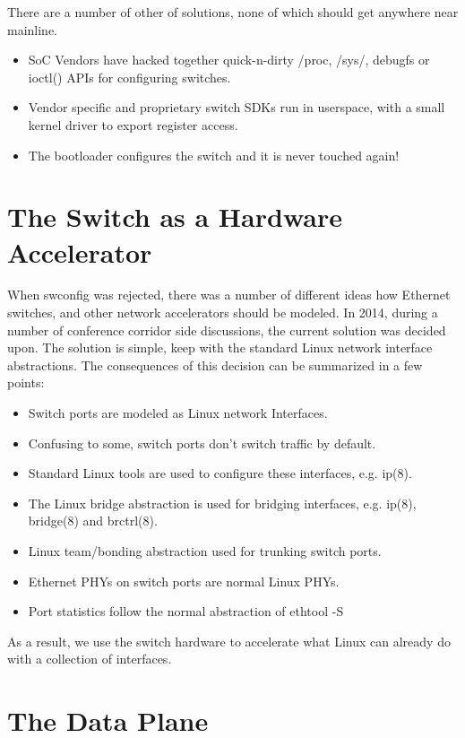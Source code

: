 \documentclass[letterpaper]{article}
\begin{document}
There are a number of other of solutions, none of which should get
anywhere near mainline.

\begin{itemize}
\item SoC Vendors have hacked together quick-n-dirty /proc, /sys/,
  debugfs or ioctl() APIs for configuring switches.
\item Vendor specific and proprietary switch SDKs run in userspace,
  with a small kernel driver to export register access.
\item The bootloader configures the switch and it is never touched again!
\end{itemize}

\section{The Switch as a Hardware Accelerator}

When swconfig was rejected, there was a number of different ideas how
Ethernet switches, and other network accelerators should be
modeled. In 2014, during a number of conference corridor side
discussions, the current solution was decided upon. The solution is
simple, keep with the standard Linux network interface
abstractions. The consequences of this decision can be summarized in a
few points:

\begin{itemize}
\item Switch ports are modeled as Linux network Interfaces.
\item Confusing to some, switch ports don't switch traffic by default.
\item Standard Linux tools are used to configure these interfaces, e.g. ip(8).
\item The Linux bridge abstraction is used for bridging interfaces, e.g. ip(8), bridge(8) and brctrl(8).
\item Linux team/bonding abstraction used for trunking switch ports.
\item Ethernet PHYs on switch ports are normal Linux PHYs.
\item Port statistics follow the normal abstraction of ethtool -S
\end{itemize}

As a result, we use the switch hardware to accelerate what Linux can
already do with a collection of interfaces.

\section{The Data Plane}
\end{document}
